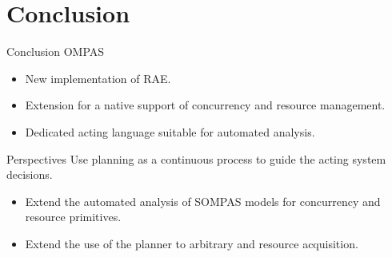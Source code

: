 \section{Conclusion}
\begin{frame}[c]{Conclusion}
    OMPAS
    \begin{itemize}
        \item New implementation of RAE.
        \item Extension for a native support of concurrency and resource management.
        \item Dedicated acting language suitable for automated analysis.
    \end{itemize}    
\end{frame}

\begin{frame}[c]{Perspectives}
    Use planning as a continuous process to guide the acting system decisions.
    \begin{itemize}
    \item Extend the automated analysis of SOMPAS models \cite{turiGuidanceRefinementbasedActing2022} for concurrency and resource primitives.
    \item Extend the use of the planner to arbitrary and resource acquisition.
    \end{itemize}
\end{frame}


